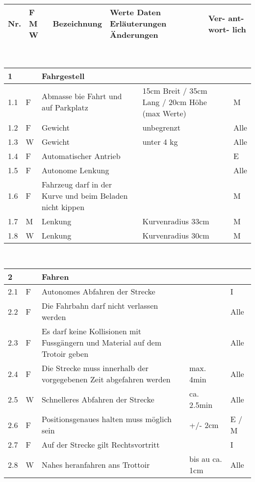 \begin{center}
\begin{tabular}{|p{1cm}|p{0.5cm}|p{5cm}|p{5cm}|p{1.5cm}|}\hline
\textbf{Nr.} & \textbf{F M W} & \textbf{Bezeichnung} & \textbf{Werte Daten Erläuterungen Änderungen} & \textbf{Ver- ant- wort- lich}\\\hline
\end{tabular}\\[0.3cm]
\begin{tabular}{|p{1cm}|p{0.5cm}|p{5cm}|p{5cm}|p{1.5cm}|}\hline
 \textbf{1} & & \textbf{Fahrgestell} & & \\\hline
 1.1 & F & Abmasse bie Fahrt und auf Parkplatz & 15cm Breit / 35cm Lang / 20cm Höhe (max Werte) & M\\ \hline
 1.2 & F & Gewicht & unbegrenzt & Alle\\\hline
 1.3 & W & Gewicht & unter 4 kg & Alle\\\hline
 1.4 & F & Automatischer Antrieb & & E\\\hline
 1.5 & F & Autonome Lenkung & & Alle\\\hline
 1.6 & F & Fahrzeug darf in der Kurve und beim Beladen nicht kippen & & M \\\hline
 1.7 & M & Lenkung & Kurvenradius 33cm & M \\\hline
 1.8 & W & Lenkung & Kurvenradius 30cm & M \\\hline
\end{tabular}\\[0.3cm]
\begin{tabular}{|p{1cm}|p{0.5cm}|p{5cm}|p{5cm}|p{1.5cm}|}\hline
 \textbf{2} & & \textbf{Fahren} & & \\\hline
 2.1 & F & Autonomes Abfahren der Strecke & & I\\\hline
 2.2 & F & Die Fahrbahn darf nicht verlassen werden & & Alle\\\hline
 2.3 & F & Es darf keine Kollisionen mit Fussgängern und Material auf dem Trotoir geben & & Alle \\\hline
 2.4 & F & Die Strecke muss innerhalb der vorgegebenen Zeit abgefahren werden & max. 4min & Alle\\\hline
 2.5 & W & Schnelleres Abfahren der Strecke & ca. 2.5min & Alle\\\hline
 2.6 & F & Positionsgenaues halten muss möglich sein & +/- 2cm & E / M\\\hline
 2.7 & F & Auf der Strecke gilt Rechtsvortritt & & I \\\hline
 2.8 & W & Nahes heranfahren ans Trottoir & bis au ca. 1cm & Alle\\\hline

\end{tabular}
\end{center}
